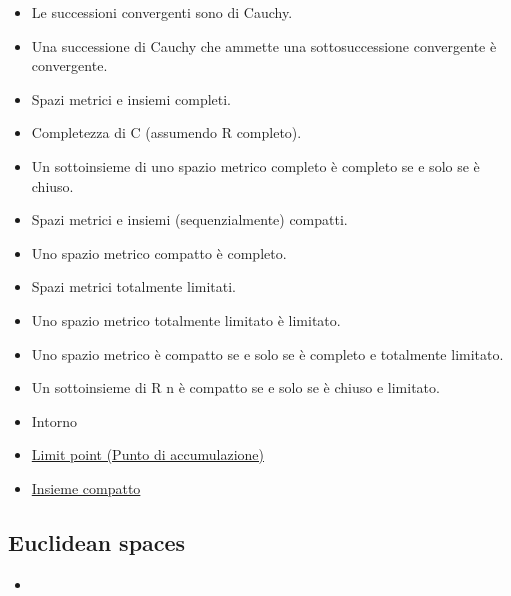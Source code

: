 \documentclass[a4paper,10pt]{article}
\begin{document}
\begin{itemize}
    \item Le successioni convergenti sono di Cauchy. 
    \item Una successione di Cauchy che ammette una sottosuccessione convergente è convergente. 
    \item Spazi metrici e insiemi completi.
    \item Completezza di C (assumendo R completo). 
    \item Un sottoinsieme di uno spazio metrico completo è completo se e solo se è chiuso. 
    \item Spazi metrici e insiemi (sequenzialmente) compatti. 
    \item Uno spazio metrico compatto è completo. 
    \item Spazi metrici totalmente limitati. 
    \item Uno spazio metrico totalmente limitato è limitato. 
    \item Uno spazio metrico è compatto se e solo se è completo e totalmente limitato. 
    \item Un sottoinsieme di R n è compatto se e solo se è chiuso e limitato. 
    \item Intorno
    \item \href{LimitPoint.html}{Limit point (Punto di accumulazione)}
    \item \href{InsiemeCompatto.html}{Insieme compatto}
  \end{itemize}  

  \subsection*{Euclidean spaces}
    \begin{itemize}
     \item 
    \end{itemize}

  
\end{document}
